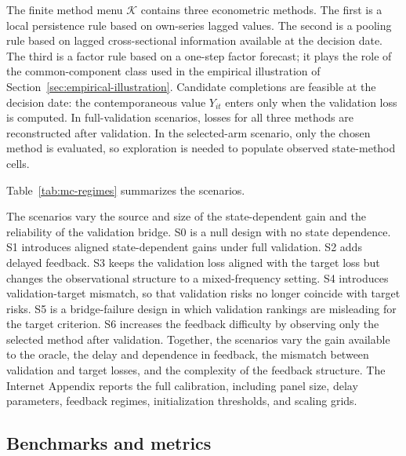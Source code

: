\documentclass[a4paper, 12pt]{article}
\theoremstyle{plain}
\theoremstyle{remark}
\newcommand{\Kcal}{\mathcal{K}}
\newcommand{\1}{\mathbf{1}}
\begin{document}
The finite method menu \(\Kcal\) contains three econometric methods. The first is a local persistence rule based on own-series lagged values. The second is a pooling rule based on lagged cross-sectional information available at the decision date. The third is a factor rule based on a one-step factor forecast; it plays the role of the common-component class used in the empirical illustration of Section~\ref{sec:empirical-illustration}. Candidate completions are feasible at the decision date: the contemporaneous value \(Y_{it}\) enters only when the validation loss is computed. In full-validation scenarios, losses for all three methods are reconstructed after validation. In the selected-arm scenario, only the chosen method is evaluated, so exploration is needed to populate observed state-method cells.

Table~\ref{tab:mc-regimes} summarizes the scenarios.



The scenarios vary the source and size of the state-dependent gain and the reliability of the validation bridge. S0 is a null design with no state dependence. S1 introduces aligned state-dependent gains under full validation. S2 adds delayed feedback. S3 keeps the validation loss aligned with the target loss but changes the observational structure to a mixed-frequency setting. S4 introduces validation-target mismatch, so that validation risks no longer coincide with target risks. S5 is a bridge-failure design in which validation rankings are misleading for the target criterion. S6 increases the feedback difficulty by observing only the selected method after validation. Together, the scenarios vary the gain available to the oracle, the delay and dependence in feedback, the mismatch between validation and target losses, and the complexity of the feedback structure. The Internet Appendix reports the full calibration, including panel size, delay parameters, feedback regimes, initialization thresholds, and scaling grids.

\subsection{Benchmarks and metrics}
\label{subsec:mc-metrics}
\end{document}

